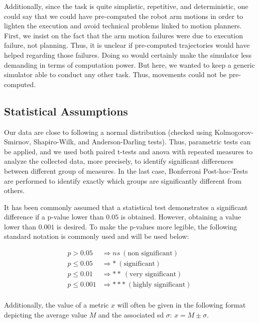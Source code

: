Additionally, since the task is quite simplistic, repetitive, and deterministic, one could say that we could have pre-computed the robot arm motions in order to lighten the execution and avoid technical problems linked to motion planners. First, we insist on the fact that the arm motion failures were due to execution failure, not planning. Thus, it is unclear if pre-computed trajectories would have helped regarding those failures. Doing so would certainly make the simulator less demanding in terms of computation power. But here, we wanted to keep a generic simulator able to conduct any other task. Thus, movements could not be pre-computed.

\subsection{Statistical Assumptions}

Our data are close to following a normal distribution (checked using Kolmogorov-Smirnov, Shapiro-Wilk, and Anderson-Darling tests). Thus, parametric tests can be applied, and we used both paired t-tests and \acrfull{anova} with repeated measures to analyze the collected data, more precisely, to identify significant differences between different group of measures. 
In the last case, Bonferroni Post-hoc-Tests are performed to identify exactly which groups are significantly different from others.

It has been commonly assumed that a statistical test demonstrates a significant difference if a p-value lower than $0.05$ is obtained. However, obtaining a value lower than $0.001$ is desired. To make the p-values more legible, the following standard notation is commonly used and will be used below:

\begin{align*}
    p > 0.05        & \Rightarrow ns ~ (\textrm{non significant})\\
    p \leq 0.05     & \Rightarrow * ~ (\textrm{significant})\\
    p \leq 0.01     & \Rightarrow ** ~ (\textrm{very significant})\\
    p \leq 0.001    & \Rightarrow *** ~ (\textrm{highly significant})\\
\end{align*}

Additionally, the value of a metric $x$ will often be given in the following format depicting the average value $M$ and the associated \acrfull{sd} $\sigma$: $x = M \pm \sigma$.


